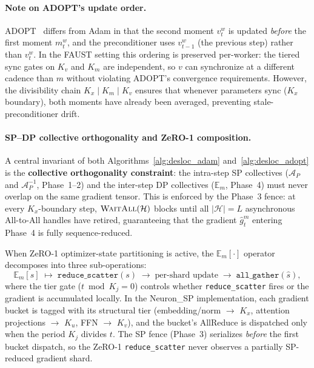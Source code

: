 \documentclass{article}
\begin{document}
\paragraph{Note on ADOPT's update order.}
ADOPT~\citep{taniguchi2024adoptmodifiedadamconverge} differs from Adam in that the
second moment $v^w_t$ is updated \emph{before} the first moment $m^w_t$,
and the preconditioner uses $v^w_{t-1}$ (the previous step) rather than $v^w_t$.
In the FAUST setting this ordering is preserved per-worker: the tiered sync
gates on $K_v$ and $K_m$ are independent, so $v$ can synchronize at a different
cadence than $m$ without violating ADOPT's convergence requirements.
However, the divisibility chain $K_x \mid K_m \mid K_v$ ensures that whenever
parameters sync ($K_x$ boundary), both moments have already been averaged,
preventing stale-preconditioner drift.


\paragraph{SP--DP collective orthogonality and ZeRO-1 composition.}
A central invariant of both Algorithms~\ref{alg:desloc_adam} and~\ref{alg:desloc_adopt}
is the \textbf{collective orthogonality constraint}: the intra-step SP collectives
($\mathcal{A}_P$ and $\mathcal{A}_P^{-1}$, Phase~1--2) and the inter-step DP
collectives ($\mathbb{E}_m$, Phase~4) must never overlap on the same gradient tensor.
This is enforced by the Phase~3 fence: at every $K_x$-boundary step,
$\textsc{WaitAll}(\mathcal{H})$ blocks until all $|\mathcal{H}| = L$ asynchronous
All-to-All handles have retired, guaranteeing that the gradient $\hat{g}^m_t$ entering
Phase~4 is fully sequence-reduced.

When ZeRO-1 optimizer-state partitioning is active, the $\mathbb{E}_m[\cdot]$ operator
decomposes into three sub-operations:
\begin{equation}
\mathbb{E}_m[s] \;\longmapsto\; \texttt{reduce\_scatter}(s) \;\to\; \text{per-shard update} \;\to\; \texttt{all\_gather}(\hat{s}),
\label{eq:zero1_decomposition}
\end{equation}
where the tier gate ($t \bmod K_j = 0$) controls whether
\texttt{reduce\_scatter} fires or the gradient is accumulated locally.
In the Neuron\_SP implementation, each gradient bucket is tagged with its structural
tier (embedding/norm $\to$ $K_x$, attention projections $\to$ $K_u$, FFN $\to$ $K_v$),
and the bucket's AllReduce is dispatched only when the period $K_j$ divides $t$.
The SP fence (Phase~3) serializes \emph{before} the first bucket dispatch, so the
ZeRO-1 \texttt{reduce\_scatter} never observes a partially SP-reduced gradient shard.
\end{document}

